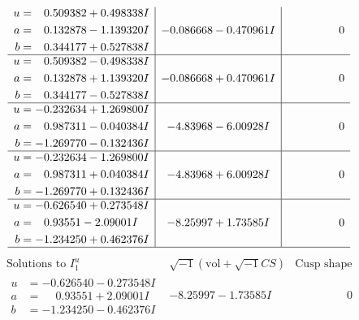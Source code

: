 \documentclass[1p]{elsarticle_modified}
\theoremstyle{definition}
\newcommand{\I}{\sqrt{-1}}
\begin{document}
$$\begin{array}{c|c|c}
\begin{aligned}
u &= \phantom{-}0.509382 + 0.498338 I \\
a &= \phantom{-}0.132878 - 1.139320 I \\
b &= \phantom{-}0.344177 + 0.527838 I\end{aligned}
 & -0.086668 - 0.470961 I & \phantom{-0.000000 } 0 \\ \hline\begin{aligned}
u &= \phantom{-}0.509382 - 0.498338 I \\
a &= \phantom{-}0.132878 + 1.139320 I \\
b &= \phantom{-}0.344177 - 0.527838 I\end{aligned}
 & -0.086668 + 0.470961 I & \phantom{-0.000000 } 0 \\ \hline\begin{aligned}
u &= -0.232634 + 1.269800 I \\
a &= \phantom{-}0.987311 - 0.040384 I \\
b &= -1.269770 - 0.132436 I\end{aligned}
 & -4.83968 - 6.00928 I & \phantom{-0.000000 } 0 \\ \hline\begin{aligned}
u &= -0.232634 - 1.269800 I \\
a &= \phantom{-}0.987311 + 0.040384 I \\
b &= -1.269770 + 0.132436 I\end{aligned}
 & -4.83968 + 6.00928 I & \phantom{-0.000000 } 0 \\ \hline\begin{aligned}
u &= -0.626540 + 0.273548 I \\
a &= \phantom{-}0.93551 - 2.09001 I \\
b &= -1.234250 + 0.462376 I\end{aligned}
 & -8.25997 + 1.73585 I & \phantom{-0.000000 } 0\\
 \hline 
 \end{array}$$\newpage$$\begin{array}{c|c|c}  
\text{Solutions to }I^u_{1}& \I (\text{vol} + \sqrt{-1}CS) & \text{Cusp shape}\\
 \hline 
\begin{aligned}
u &= -0.626540 - 0.273548 I \\
a &= \phantom{-}0.93551 + 2.09001 I \\
b &= -1.234250 - 0.462376 I\end{aligned}
 & -8.25997 - 1.73585 I & \phantom{-0.000000 } 0 \\ \hline\begin{aligned}

\end{aligned}
\end{array}$$
\end{document}
